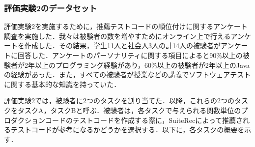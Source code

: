 \documentclass[12pt]{jarticle} %
\begin{document}
\subsubsection{評価実験2のデータセット}

評価実験2を実施するために，推薦テストコードの順位付けに関するアンケート調査を実施した．我々は被験者の数を増やすためにオンライン上で行えるアンケートを作成した．その結果，学生11人と社会人3人の計14人の被験者がアンケートに回答した．アンケートのパーソナリティに関する項目によると90\%以上の被験者が2年以上のプログラミング経験があり，60\%以上の被験者が2年以上のJavaの経験があった．また，すべての被験者が授業などの講義でソフトウェアテストに関する基本的な知識を持っていた．

評価実験2では，被験者に2つのタスクを割り当てた．以降，これらの2つのタスクをタスクA，タスクBと呼ぶ．被験者は，各タスクで与えられる関数単位のプロダクションコードのテストコードを作成する際に，{\sf SuiteRec}によって推薦されるテストコードが参考になるかどうかを選択する．以下に，各タスクの概要を示す．
\end{document}
